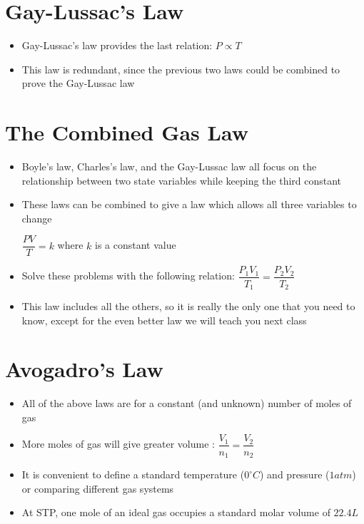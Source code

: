 \documentclass[12pt, openany, letterpaper]{memoir}
\begin{document}
\section{Gay-Lussac's Law}
\begin{itemize}
	\item Gay-Lussac's law provides the last relation: $P\propto T$
	\item This law is redundant, since the previous two laws could be combined to prove the Gay-Lussac law
\end{itemize}

\section{The Combined Gas Law}
\begin{itemize}
	\item Boyle's law, Charles's law, and the Gay-Lussac law all focus on the relationship between two state variables while keeping the third constant
	\item These laws can be combined to give a law which allows all three variables to change

	      $\dfrac{PV}{T} = k$ where $k$ is a constant value
	\item Solve these problems with the following relation: $\dfrac{P_1V_1}{T_1}=\dfrac{P_2V_2}{T_2}$
	\item This law includes all the others, so it is really the only one that you need to know, except for the even better law we will teach you next class
\end{itemize}

\section{Avogadro's Law}
\begin{itemize}
	\item All of the above laws are for a constant (and unknown) number of moles of gas
	\item More moles of gas will give greater volume : $\dfrac{V_1}{n_1} = \dfrac{V_2}{n_2}$
	\item It is convenient to define a standard temperature ($0^\circ C$) and pressure ($1atm$) or comparing different gas systems
	\item At STP, one mole of an ideal gas occupies a standard molar volume of $22.4L$
\end{itemize}
\end{document}
